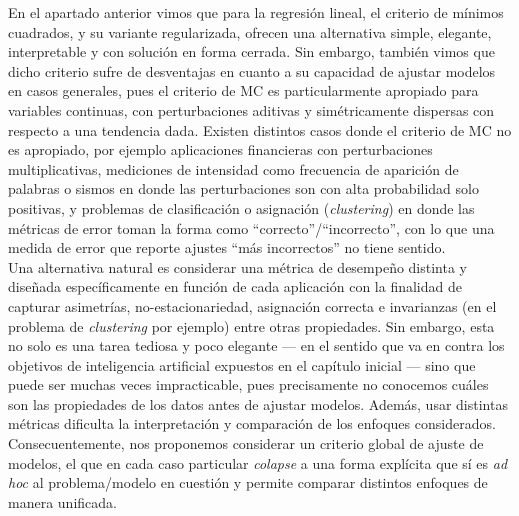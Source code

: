 En el apartado anterior vimos que para la regresión lineal, el criterio de  mínimos cuadrados, y su variante regularizada, ofrecen una alternativa simple, elegante, interpretable y con solución en forma cerrada. Sin embargo, también vimos que dicho criterio sufre de desventajas en cuanto a su capacidad de ajustar modelos en casos generales, pues el criterio de MC es particularmente apropiado para variables continuas, con perturbaciones aditivas  y simétricamente dispersas con respecto a una tendencia dada. Existen distintos casos donde el criterio de MC no es apropiado, por ejemplo aplicaciones financieras con  perturbaciones multiplicativas, mediciones de intensidad como frecuencia de aparición de palabras o sismos en donde las perturbaciones son con alta probabilidad solo positivas, y problemas de clasificación o asignación (\emph{clustering}) en donde las métricas de error toman la forma como ``correcto''/``incorrecto'', con lo que una medida de error que reporte ajustes ``más incorrectos'' no tiene sentido. \\

Una alternativa natural es considerar una métrica de desempeño distinta y diseñada específicamente en función  de cada aplicación con la finalidad de capturar asimetrías, no-estacionariedad, asignación correcta e invarianzas (en el problema de \emph{clustering} por ejemplo) entre otras propiedades. Sin embargo, esta no solo es una tarea tediosa y poco elegante --- en el sentido que va en contra los objetivos de inteligencia artificial expuestos en el capítulo inicial --- sino que puede ser muchas veces impracticable, pues precisamente no conocemos cuáles son las propiedades de los datos antes de ajustar modelos. Además, usar distintas métricas dificulta la interpretación y comparación de los enfoques considerados. Consecuentemente, nos proponemos considerar un criterio global de ajuste de modelos, el que en cada caso particular \emph{colapse} a una forma explícita que sí es \emph{ad hoc} al problema/modelo en cuestión y permite comparar distintos enfoques de manera unificada.\\

